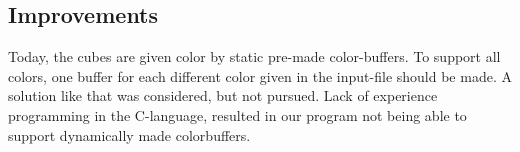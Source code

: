 \subsection{Improvements}
Today, the cubes are given color by static pre-made color-buffers. 
To support all colors, one buffer for each different color given in the input-file should be made. 
A solution like that was considered, but not pursued.
Lack of experience programming in the C-language, resulted in our program not being able to support dynamically made colorbuffers.


